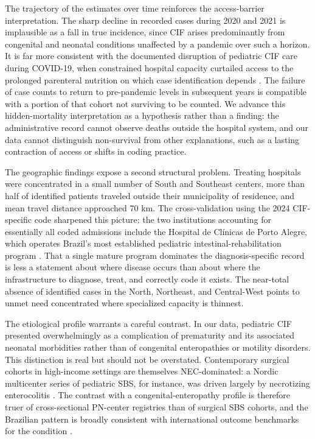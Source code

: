 \documentclass[12pt,a4paper]{article}
\theoremstyle{plain}
\theoremstyle{definition}
\theoremstyle{remark}
\begin{document}
The trajectory of the estimates over time reinforces the access-barrier interpretation. The sharp decline in recorded cases during 2020 and 2021 is implausible as a fall in true incidence, since CIF arises predominantly from congenital and neonatal conditions unaffected by a pandemic over such a horizon. It is far more consistent with the documented disruption of pediatric CIF care during COVID-19, when constrained hospital capacity curtailed access to the prolonged parenteral nutrition on which case identification depends \cite{hilberath2024impact}. The failure of case counts to return to pre-pandemic levels in subsequent years is compatible with a portion of that cohort not surviving to be counted. We advance this hidden-mortality interpretation as a hypothesis rather than a finding: the administrative record cannot observe deaths outside the hospital system, and our data cannot distinguish non-survival from other explanations, such as a lasting contraction of access or shifts in coding practice.

The geographic findings expose a second structural problem. Treating hospitals were concentrated in a small number of South and Southeast centers, more than half of identified patients traveled outside their municipality of residence, and mean travel distance approached 70 km. The cross-validation using the 2024 CIF-specific code sharpened this picture: the two institutions accounting for essentially all coded admissions include the Hospital de Clínicas de Porto Alegre, which operates Brazil's most established pediatric intestinal-rehabilitation program \cite{goldani2022outcomes}. That a single mature program dominates the diagnosis-specific record is less a statement about where disease occurs than about where the infrastructure to diagnose, treat, and correctly code it exists. The near-total absence of identified cases in the North, Northeast, and Central-West points to unmet need concentrated where specialized capacity is thinnest.

The etiological profile warrants a careful contrast. In our data, pediatric CIF presented overwhelmingly as a complication of prematurity and its associated neonatal morbidities rather than of congenital enteropathies or motility disorders. This distinction is real but should not be overstated. Contemporary surgical cohorts in high-income settings are themselves NEC-dominated: a Nordic multicenter series of pediatric SBS, for instance, was driven largely by necrotizing enterocolitis \cite{mutanen2023nordic}. The contrast with a congenital-enteropathy profile is therefore truer of cross-sectional PN-center registries than of surgical SBS cohorts, and the Brazilian pattern is broadly consistent with international outcome benchmarks for the condition \cite{avitzur2024iifr}.
\end{document}
